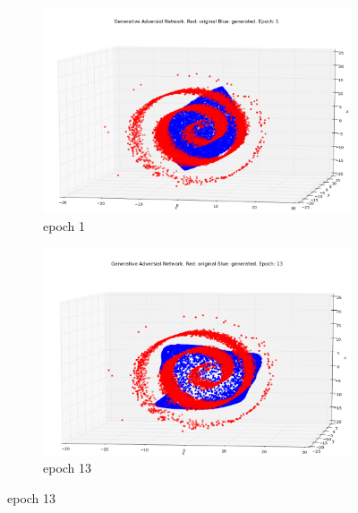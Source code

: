 \begin{figure}
\centering

\begin{subfigure}[t]{.4\textwidth}
\centering
\includegraphics[width=\linewidth]{GANResults/Both1.png}
        \caption{epoch 1}
\end{subfigure}
%
\begin{subfigure}[t]{.4\textwidth}
\centering
\includegraphics[width=\linewidth]{GANResults/Both13.png}
\caption{epoch 13}
\end{subfigure}
\medskip


\end{figure}
